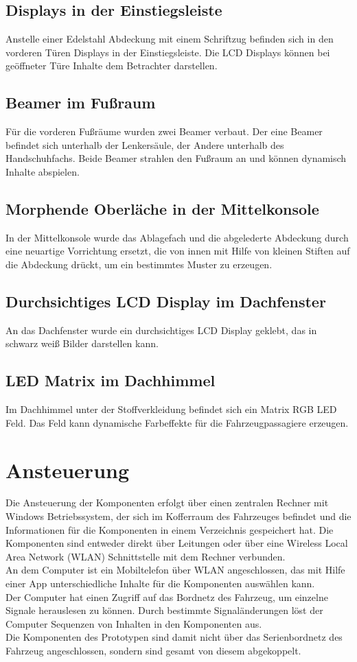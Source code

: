 \subsection{Displays in der Einstiegsleiste}
Anstelle einer Edelstahl Abdeckung mit einem Schriftzug befinden sich in den vorderen Türen Displays in der Einstiegsleiste. Die LCD Displays können bei geöffneter Türe Inhalte dem Betrachter darstellen.
\subsection{Beamer im Fußraum}
Für die vorderen Fußräume wurden zwei Beamer verbaut. Der eine Beamer befindet sich unterhalb der Lenkersäule, der Andere unterhalb des Handschuhfachs. Beide Beamer strahlen den Fußraum an und können dynamisch Inhalte abspielen.
\subsection{Morphende Oberläche in der Mittelkonsole}
In der Mittelkonsole wurde das Ablagefach und die abgelederte Abdeckung durch eine neuartige Vorrichtung ersetzt, die von innen mit Hilfe von kleinen Stiften auf die Abdeckung drückt, um ein bestimmtes Muster zu erzeugen.
\subsection{Durchsichtiges LCD Display im Dachfenster}
An das Dachfenster wurde ein durchsichtiges LCD Display geklebt, das in schwarz weiß Bilder darstellen kann.
\subsection{LED Matrix im Dachhimmel}
Im Dachhimmel unter der Stoffverkleidung befindet sich ein Matrix RGB LED Feld. Das Feld kann dynamische Farbeffekte für die Fahrzeugpassagiere erzeugen.
\section{Ansteuerung}
Die Ansteuerung der Komponenten erfolgt über einen zentralen Rechner mit Windows Betriebssystem, der sich im Kofferraum des Fahrzeuges befindet und die Informationen für die Komponenten in einem Verzeichnis gespeichert hat. Die Komponenten sind entweder direkt über Leitungen oder über eine Wireless Local Area Network (WLAN) Schnittstelle mit dem Rechner verbunden.\\
An dem Computer ist ein Mobiltelefon über WLAN angeschlossen, das mit Hilfe einer App unterschiedliche Inhalte für die Komponenten auswählen kann.\\
Der Computer hat einen Zugriff auf das Bordnetz des Fahrzeug, um einzelne Signale herauslesen zu können. Durch bestimmte Signaländerungen löst der Computer Sequenzen von Inhalten in den Komponenten aus.\\
Die Komponenten des Prototypen sind damit nicht über das Serienbordnetz des Fahrzeug angeschlossen, sondern sind gesamt von diesem abgekoppelt. 
